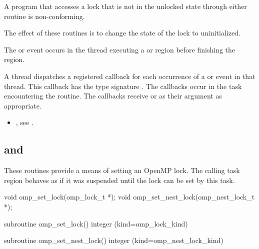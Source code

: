 \constraints
A program that accesses a lock that is not in the unlocked state through either routine is 
non-conforming.

\effect
The effect of these routines is to change the state of the lock to uninitialized.

\events

The  or  event occurs in the thread 
executing a  or  region
before finishing the region.

\tools

A thread dispatches a registered 
callback for each occurrence of a  or  event 
in that thread.  This callback has the type signature .
The callbacks occur in the task encountering the routine.
The callbacks receive  or 
  as their  argument as appropriate.


\crossreferences
\begin{itemize}
\item {}, see 
.
\end{itemize}









\subsection{ and }
\label{subsec:omp_set_lock and omp_set_nest_lock}
\summary
These routines provide a means of setting an OpenMP lock. The calling
task region behaves as if it was suspended until the lock can be set
by this task.

\format
\ccppspecificstart
\begin{boxedcode}
void omp\_set\_lock(omp\_lock\_t *);
void omp\_set\_nest\_lock(omp\_nest\_lock\_t *);
\end{boxedcode}
\ccppspecificend

\fortranspecificstart
\begin{boxedcode}
subroutine omp\_set\_lock()
integer (kind=omp\_lock\_kind) 

subroutine omp\_set\_nest\_lock()
integer (kind=omp\_nest\_lock\_kind) 
\end{boxedcode}
\fortranspecificend

